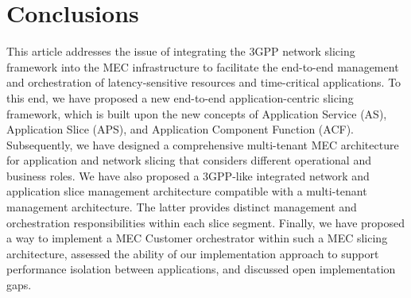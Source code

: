 \section{Conclusions}
\label{sec:conclusions}
%
\noindent
%
This article addresses the issue of integrating the 3GPP network slicing framework into the MEC infrastructure to facilitate the end-to-end management and orchestration of latency-sensitive resources and time-critical applications. To this end, we have proposed a new end-to-end application-centric slicing framework, which is built upon the new concepts of Application Service (AS), Application Slice (APS), and Application Component Function (ACF). Subsequently, we have designed a comprehensive multi-tenant MEC architecture for application and network slicing that considers different operational and business roles. We have also proposed a 3GPP-like integrated network and application slice management architecture compatible with a multi-tenant management architecture. The latter provides distinct management and orchestration responsibilities within each slice segment. Finally, we have proposed a way to implement a MEC Customer orchestrator within such a MEC slicing architecture, assessed the ability of our implementation approach to support performance isolation between applications, and discussed open implementation gaps. 

